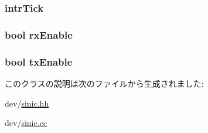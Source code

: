 \label{classSinic_1_1Base_a3839fcc574c7379ba7ec297aba0396e2}
\hypertarget{classSinic_1_1Base_ad967cc729c22843df7961315b2fdab72}{
\subsubsection[{intrTick}]{ {\bf intrTick}}}
\label{classSinic_1_1Base_ad967cc729c22843df7961315b2fdab72}
\hypertarget{classSinic_1_1Base_a62cd12a758780749d1ed0ec4d4cfbe71}{
\subsubsection[{rxEnable}]{\setlength{\rightskip}{0pt plus 5cm}bool {\bf rxEnable}}}
\label{classSinic_1_1Base_a62cd12a758780749d1ed0ec4d4cfbe71}
\hypertarget{classSinic_1_1Base_a950ab5d638f497b596eacdbf60bcb3f0}{
\subsubsection[{txEnable}]{\setlength{\rightskip}{0pt plus 5cm}bool {\bf txEnable}}}
\label{classSinic_1_1Base_a950ab5d638f497b596eacdbf60bcb3f0}


このクラスの説明は次のファイルから生成されました:\begin{DoxyCompactItemize}
\item 
dev/\hyperlink{sinic_8hh}{sinic.hh}\item 
dev/\hyperlink{sinic_8cc}{sinic.cc}\end{DoxyCompactItemize}
